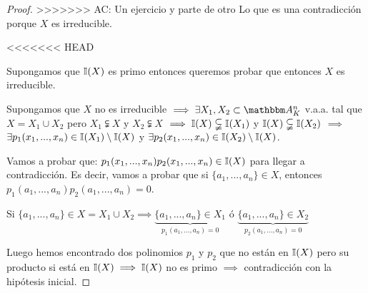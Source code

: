\begin{proof}
>>>>>>> AC: Un ejercicio y parte de otro
	Lo que es una contradicción porque $X$ es irreducible.

	\proofpart{$\Leftarrow$}
<<<<<<< HEAD

	Supongamos que $\mathbb{I}(X)$ es primo entonces queremos probar que entonces $X$ es irreducible.

	Supongamos que $X$ no es irreducible $\implies \exists X_1,X_2 \subset \A_K^n$ v.a.a. tal que $X=X_1 \cup X_2$ pero $X_1 \subsetneqq X$ y $X_2 \subsetneqq X$ $\implies \mathbb{I}(X) \subsetneqq \mathbb{I}(X_1)$ y $\mathbb{I}(X) \subsetneqq \mathbb{I}(X_2)$ $\implies$ $\exists p_1(x_1,...,x_n) \in \mathbb{I}(X_1) \setminus \mathbb{I}(X)$ y $\exists p_2(x_1,...,x_n) \in \mathbb{I}(X_2)\setminus \mathbb{I}(X)$.

	Vamos a probar que: $p_1(x_1,...,x_n)p_2(x_1,...,x_n) \in \mathbb{I}(X)$ para llegar a contradicción. Es decir, vamos a probar que si $\{a_1,...,a_n\} \in X$, entonces $p_1(a_1,...,a_n)p_2(a_1,...,a_n)=0$.

	Si $\{a_1,...,a_n\} \in X = X_1 \cup X_2 \implies \underbrace{\{a_1,...,a_n\}\in X_1}_{p_1(a_1,...,a_n)=0}$ ó $\underbrace{\{a_1,...,a_n\}\in X_2}_{p_2(a_1,...,a_n)=0}$

	Luego hemos encontrado dos polinomios $p_1$ y $p_2$ que no están en $\mathbb{I}(X)$ pero su producto si está en $\mathbb{I}(X) \implies \mathbb{I}(X)$ no es primo $\implies$ contradicción con la hipótesis inicial.
\end{proof}

